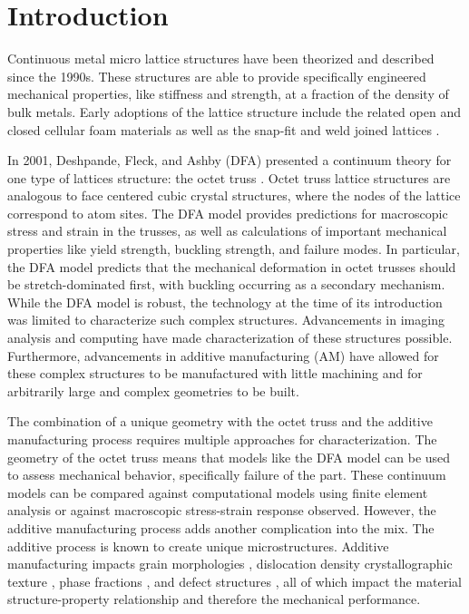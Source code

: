 \section{Introduction}
Continuous metal micro lattice structures have been theorized and described since the 1990s. These structures are able to provide specifically engineered mechanical properties, like stiffness and strength, at a fraction of the density of bulk metals. Early adoptions of the lattice structure include the related open and closed cellular foam materials \cite{Bonatti2017} as well as the snap-fit and weld joined lattices \cite{Dong2015}. 

In 2001, Deshpande, Fleck, and Ashby (DFA) presented a continuum theory for one type of lattices structure: the octet truss \cite{Deshpande2001}. Octet truss lattice structures are analogous to face centered cubic crystal structures, where the nodes of the lattice correspond to atom sites. The DFA model provides predictions for macroscopic stress and strain in the trusses, as well as calculations of important mechanical properties like yield strength, buckling strength, and failure modes. In particular, the DFA model predicts that the mechanical deformation in octet trusses should be stretch-dominated first, with buckling occurring as a secondary mechanism. While the DFA model is robust, the technology at the time of its introduction was limited to characterize such complex structures. Advancements in imaging analysis and computing have made characterization of these structures possible. Furthermore, advancements in additive manufacturing (AM) have allowed for these complex structures to be manufactured with little machining and for arbitrarily large and complex geometries to be built.

The combination of a unique geometry with the octet truss and the additive manufacturing process requires multiple approaches for characterization. The geometry of the octet truss means that models like the DFA model can be used to assess mechanical behavior, specifically failure of the part. These continuum models can be compared against computational models using finite element analysis or against macroscopic stress-strain response observed. However, the additive manufacturing process adds another complication into the mix. The additive process is known to create unique microstructures. Additive manufacturing impacts grain morphologies \cite{Tan2015, Zhu2018}, dislocation density \cite{Zhang2015, Wang2017, Gallmeyer2020} crystallographic texture \cite{Wang2019}, phase fractions \cite{Gallmeyer2020}, and defect structures \cite{Yang2017,Matthews2016}, all of which impact the material structure-property relationship and therefore the mechanical performance. 

